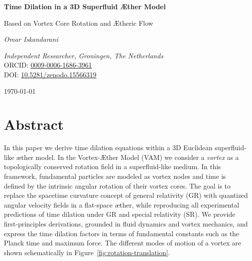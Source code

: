 \documentclass[a4paper,12pt]{article}
\begin{document}
    \begin{titlepage}
        \thispagestyle{empty}
        \centering
        \vspace*{2cm}
        {\Huge\bfseries Time Dilation in a 3D Superfluid Æther Model \par}
        \vspace{0.5cm}
        {\Large Based on Vortex Core Rotation and Ætheric Flow \par}
        \vspace{2cm}
        {\Large\itshape Omar Iskandarani\par}
        \vspace{0.5cm}
        \textit{Independent Researcher, Groningen, The Netherlands} \\
        ORCID: \href{https://orcid.org/0009-0006-1686-3961}{0009-0006-1686-3961} \\
        DOI: \href{https://doi.org/10.5281/zenodo.15566319}{10.5281/zenodo.15566319} \\
        \vfill
        {\large \today\par}


    \section*{Abstract}
    In this paper we derive time dilation equations within a 3D Euclidean superfluid-like æther model. In the Vortex-Æther Model (VAM) we consider a \textit{vortex} as a topologically conserved rotation field in a superfluid-like medium. In this framework, fundamental particles are modeled as vortex nodes and time is defined by the intrinsic angular rotation of their vortex cores. The goal is to replace the spacetime curvature concept of general relativity (GR) with quantized angular velocity fields in a flat-space æther, while reproducing all experimental predictions of time dilation under GR and special relativity (SR). We provide first-principles derivations, grounded in fluid dynamics and vortex mechanics, and express the time dilation factors in terms of fundamental constants such as the Planck time and maximum force. The different modes of motion of a vortex are shown schematically in Figure~\ref{fig:rotation-translation}.

    \begin{figure}[H]
        \centering
\end{figure}
\end{titlepage}
\end{document}
